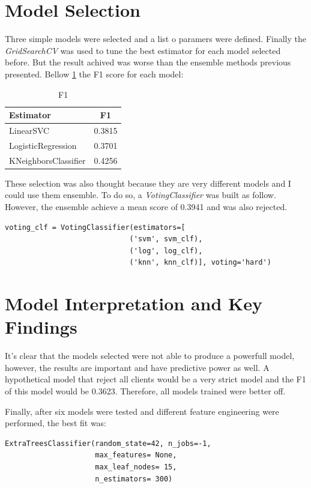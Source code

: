 \documentclass[11pt, a4]{article}
\begin{document}
\section*{Model Selection}

Three simple models were selected and a list o paramers were defined. Finally the \textit{GridSearchCV} was used to tune the best estimator for each model selected before. But the result achived was worse than the ensemble methods previous presented. Bellow \ref{table:5} the F1 score for each model:

\begin{table}[h!]
\centering
\begin{tabular}{l c }
\toprule
\textbf{Estimator} & \textbf{F1} \\
\midrule
LinearSVC & 0.3815\\
LogisticRegression & 0.3701\\
KNeighborsClassifier & 0.4256\\
\bottomrule
\end{tabular}
\caption{F1}
\label{table:5}
\end{table}

These selection was also thought because they are very different models and I could use them ensemble. To do so, a \textit{VotingClassifier} was built as follow. However, the ensemble achieve a mean score of 0.3941 and was also rejected.

\begin{lstlisting} 
voting_clf = VotingClassifier(estimators=[
                             ('svm', svm_clf), 
                             ('log', log_clf), 
                             ('knn', knn_clf)], voting='hard')
\end{lstlisting}


\section*{Model Interpretation and Key Findings}

It's clear that the models selected were not able to produce a powerfull model, however, the results are important and have predictive power as well. A hypothetical model that reject all clients would be a very strict model and the F1 of this model would be 0.3623. Therefore, all models trained were better off.

Finally, after six models were tested and different feature engineering were performed, the best fit was: 

\begin{lstlisting} 
ExtraTreesClassifier(random_state=42, n_jobs=-1, 
					 max_features= None, 
					 max_leaf_nodes= 15, 
					 n_estimators= 300)
\end{lstlisting}
\end{document}

